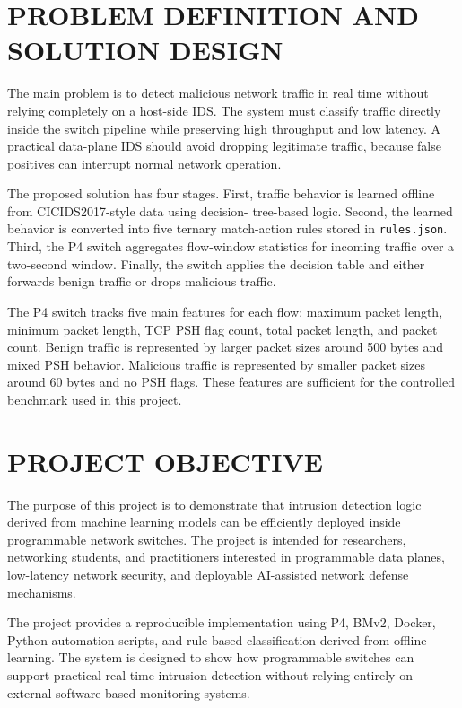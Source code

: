 \documentclass[conference]{IEEEtran}
\begin{document}
\section{PROBLEM DEFINITION AND SOLUTION DESIGN}

The main problem is to detect malicious network traffic
in real time without relying completely on a host-side IDS.
The system must classify traffic directly inside the switch
pipeline while preserving high throughput and low latency.
A practical data-plane IDS should avoid dropping legitimate
traffic, because false positives can interrupt normal network
operation.

The proposed solution has four stages. First, traffic behavior
is learned offline from CICIDS2017-style data using decision-
tree-based logic. Second, the learned behavior is converted into
five ternary match-action rules stored in \texttt{rules.json}. Third,
the P4 switch aggregates flow-window statistics for incoming
traffic over a two-second window. Finally, the switch applies
the decision table and either forwards benign traffic or drops
malicious traffic.

The P4 switch tracks five main features for each flow:
maximum packet length, minimum packet length, TCP PSH
flag count, total packet length, and packet count. Benign
traffic is represented by larger packet sizes around 500 bytes
and mixed PSH behavior. Malicious traffic is represented by
smaller packet sizes around 60 bytes and no PSH flags. These
features are sufficient for the controlled benchmark used in
this project.

\section{PROJECT OBJECTIVE}

The purpose of this project is to demonstrate that intrusion
detection logic derived from machine learning models can be
efficiently deployed inside programmable network switches.
The project is intended for researchers, networking students,
and practitioners interested in programmable data planes,
low-latency network security, and deployable AI-assisted
network defense mechanisms.

The project provides a reproducible implementation using
P4, BMv2, Docker, Python automation scripts, and rule-based
classification derived from offline learning. The system is
designed to show how programmable switches can support
practical real-time intrusion detection without relying entirely
on external software-based monitoring systems.
\end{document}

